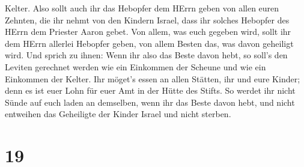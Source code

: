 Kelter.  Also sollt auch ihr das Hebopfer dem HErrn geben
von allen euren Zehnten, die ihr nehmt von den Kindern Israel, dass ihr
solches Hebopfer des HErrn dem Priester Aaron gebet.  Von
allem, was euch gegeben wird, sollt ihr dem HErrn allerlei Hebopfer
geben, von allem Besten das, was davon geheiligt wird. 
Und sprich zu ihnen: Wenn ihr also das Beste davon hebt, so soll's den
Leviten gerechnet werden wie ein Einkommen der Scheune und wie ein
Einkommen der Kelter.  Ihr möget's essen an allen
Stätten, ihr und eure Kinder; denn es ist euer Lohn für euer Amt in der
Hütte des Stifts.  So werdet ihr nicht Sünde auf euch
laden an demselben, wenn ihr das Beste davon hebt, und nicht entweihen
das Geheiligte der Kinder Israel und nicht sterben.

\hypertarget{section-18}{%
\section{19}\label{section-18}}

